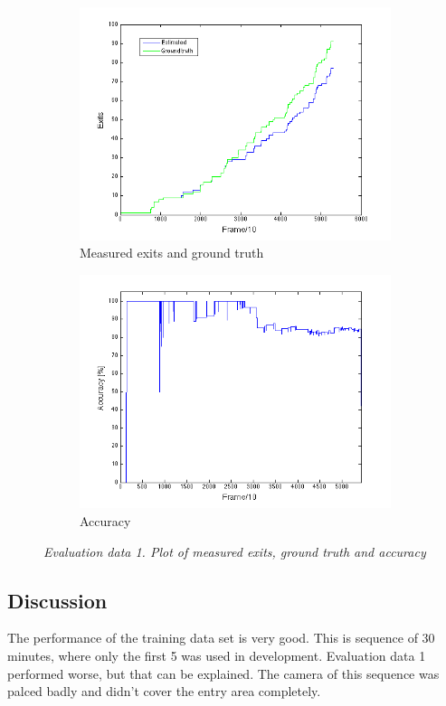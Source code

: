 \begin{figure}[H]
\centering
\begin{subfigure}{.5\textwidth}
  \centering
  \includegraphics[width=.8\linewidth]{images/ExitsEval.png}
  \caption{Measured exits and ground truth}
  \label{fig:sub1}
\end{subfigure}%
\begin{subfigure}{.5\textwidth}
  \centering
  \includegraphics[width=.8\linewidth]{images/AccExitsEval.png}
  \caption{Accuracy}
  \label{fig:sub2}
\end{subfigure}
\caption[Entries evaluation]{\textit{Evaluation data 1. Plot of measured exits, ground truth and accuracy}}
\label{fig:Exits evaluation}
\end{figure}

\subsection{Discussion}
The performance of the training data set is very good. This is sequence of 30 minutes, where only the first 5  was used in development. Evaluation data 1 performed worse, but that can be explained. The camera of this sequence was palced badly and didn't cover the entry area completely. 


